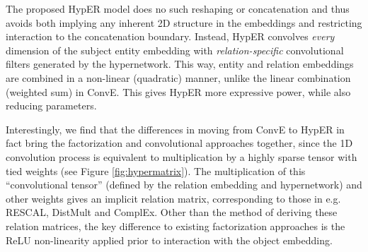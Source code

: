\documentclass[runningheads]{llncs}
\begin{document}
The proposed HypER model does no such reshaping or concatenation and thus avoids both implying any inherent 2D structure in the embeddings and restricting interaction to the concatenation boundary. Instead, HypER convolves \emph{every} dimension of the subject entity embedding with \emph{relation-specific} convolutional filters generated by the hypernetwork. This way, entity and relation embeddings are combined in a non-linear (quadratic) manner, unlike the linear combination (weighted sum) in ConvE.  This gives HypER more expressive power, while also reducing parameters. 

Interestingly, we find that the differences in moving from ConvE to HypER in fact bring the factorization and convolutional approaches together, since the 1D convolution process is equivalent to multiplication by a highly sparse tensor with tied weights (see Figure \ref{fig:hypermatrix}). The multiplication of this ``convolutional tensor'' (defined by the relation embedding and hypernetwork) and other weights gives an implicit relation matrix, corresponding to those in  e.g. RESCAL, DistMult and ComplEx. Other than the method of deriving these relation matrices, the key difference to existing factorization approaches is the ReLU non-linearity applied prior to interaction with the object embedding. 

\begin{table}[!t]
\centering
\caption{Scoring functions of state-of-the-art link prediction models, the dimensionality of their relation parameters, and their space complexity.  and  are the dimensions of entity and relation embeddings respectively,  denotes the complex conjugate of , and  denote a 2D reshaping of  and  respectively.  is the convolution operator,  the matrix of relation specific convolutional filters,  is a vectorization of a matrix and  its inverse,  is a non-linear function, and  and  respectively denote the number of entities and relations.
  }
  \label{table:models}
  \vspace{-0.5cm}
\end{table}
\end{document}

